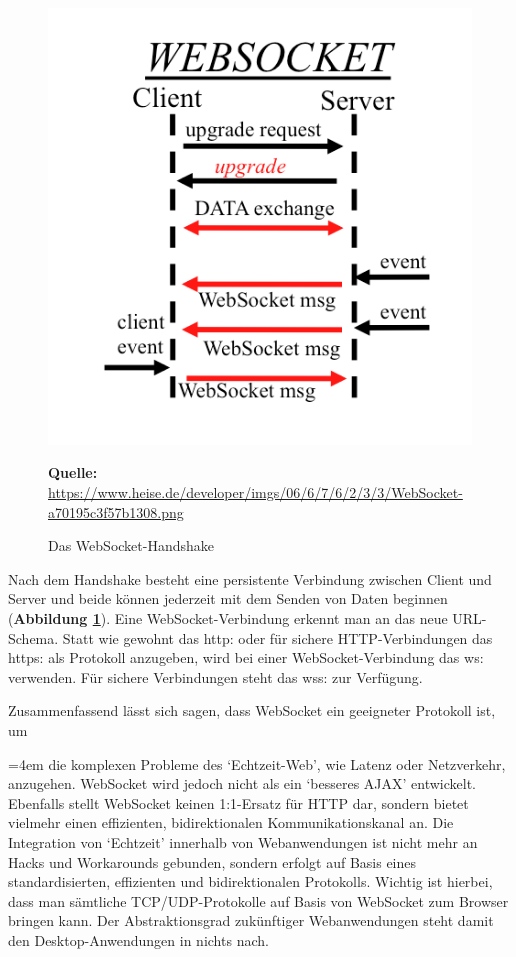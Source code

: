 \begin{figure}[H]
  \begin{center}
    \includegraphics[scale=0.4]{img/webSocketHandshake}
	\caption{Das WebSocket-Handshake}
	\footnotesize\sffamily\textbf{Quelle:} \url{https://www.heise.de/developer/imgs/06/6/7/6/2/3/3/WebSocket-a70195c3f57b1308.png} 
	\label{fig:webSocketHandshake}
  \end{center}   
\end{figure}

Nach dem Handshake besteht eine persistente Verbindung zwischen Client und Server und beide können jederzeit mit dem Senden von Daten beginnen (\textbf{Abbildung \ref{fig:webSocketHandshake}}). Eine WebSocket-Verbindung erkennt man an das neue URL-Schema. Statt wie gewohnt das \glqq http:\grqq{} oder für sichere HTTP-Verbindungen das \glqq https:\grqq{} als Protokoll anzugeben, wird bei einer WebSocket-Verbindung das \glqq ws:\grqq{} verwenden. Für sichere Verbindungen steht das \glqq wss:\grqq{} zur Verfügung.\bigskip

Zusammenfassend lässt sich sagen, dass WebSocket ein geeigneter Protokoll ist, um \bigskip

\par
\begingroup
\leftskip=4em %
\rightskip\leftskip
\noindent \glqq [...] die komplexen Probleme des ‘Echtzeit-Web’, wie Latenz oder Netzverkehr, anzugehen. WebSocket wird jedoch nicht als ein ‘besseres AJAX’ entwickelt. Ebenfalls stellt WebSocket keinen 1:1-Ersatz für HTTP dar, sondern bietet vielmehr einen effizienten, bidirektionalen Kommunikationskanal an. Die Integration von ‘Echtzeit’ innerhalb von Webanwendungen ist nicht mehr an Hacks und Workarounds gebunden, sondern erfolgt auf Basis eines standardisierten, effizienten und bidirektionalen Protokolls. Wichtig ist hierbei, dass man sämtliche TCP/UDP-Protokolle auf Basis von WebSocket zum Browser bringen kann. Der Abstraktionsgrad zukünftiger Webanwendungen steht damit den Desktop-Anwendungen in nichts nach.\grqq{} \cite{Matt2011}
\par
\endgroup

